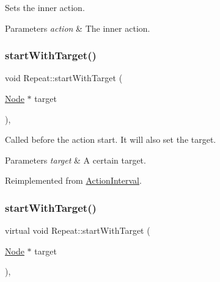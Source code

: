 Sets the inner action.


\begin{DoxyParams}{Parameters}
{\em action} & The inner action. \\
\hline
\end{DoxyParams}
\mbox{\label{classRepeat_a9581525d20c31f12cb94015183ffa220}} 
\subsubsection{\texorpdfstring{start\+With\+Target()}{startWithTarget()}\hspace{0.1cm}{\footnotesize\ttfamily [1/2]}}
{\footnotesize\ttfamily void Repeat\+::start\+With\+Target (\begin{DoxyParamCaption}\item[{\hyperlink{classNode}{Node} $\ast$}]{target }\end{DoxyParamCaption})\hspace{0.3cm}{\ttfamily [override]}, {\ttfamily [virtual]}}

Called before the action start. It will also set the target.


\begin{DoxyParams}{Parameters}
{\em target} & A certain target. \\
\hline
\end{DoxyParams}


Reimplemented from \hyperlink{classActionInterval_ad3d91186b2c3108488ddbbdbbd982484}{Action\+Interval}.

\mbox{\label{classRepeat_a23d4f9f4bd70f5e03cf9662f8c3cd1a2}} 
\subsubsection{\texorpdfstring{start\+With\+Target()}{startWithTarget()}\hspace{0.1cm}{\footnotesize\ttfamily [2/2]}}
{\footnotesize\ttfamily virtual void Repeat\+::start\+With\+Target (\begin{DoxyParamCaption}\item[{\hyperlink{classNode}{Node} $\ast$}]{target }\end{DoxyParamCaption})\hspace{0.3cm}{\ttfamily [override]}, {\ttfamily [virtual]}}

